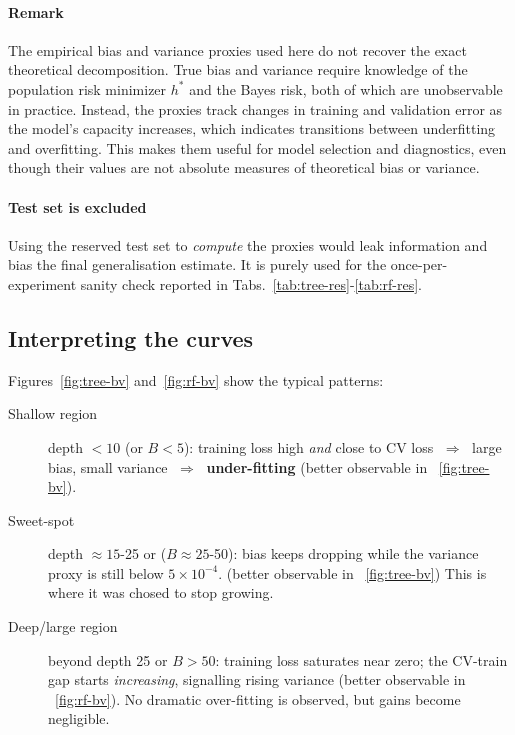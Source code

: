 \documentclass[12pt]{report}
\begin{document}
\paragraph{Remark}
The empirical bias and variance proxies used here do not recover the exact theoretical 
decomposition. True bias and variance require knowledge of the population risk minimizer 
$h^{*}$ and the Bayes risk, both of which are unobservable in practice. Instead, the 
proxies track changes in training and validation error as the model's capacity increases, 
which indicates transitions between underfitting and overfitting. 
This makes them useful for model selection and diagnostics, even though their values are 
not absolute measures of theoretical bias or variance.

\paragraph{Test set is excluded}
Using the reserved test set to \emph{compute} the proxies would leak information
and bias the final generalisation estimate. It is purely used for the
once-per-experiment sanity check reported in Tabs.~\ref{tab:tree-res}-\ref{tab:rf-res}.

\subsection{Interpreting the curves}

Figures~\ref{fig:tree-bv} and~\ref{fig:rf-bv} show the typical patterns:

\begin{description}
  \item[Shallow region]  
        depth $<\!10$ (or $B<\!5$): training loss high \emph{and} close to
        CV loss $\;\Rightarrow\;$ large bias, small variance
        $\;\Rightarrow\;$ \textbf{under-fitting} 
        (better observable in ~\ref{fig:tree-bv}).
  \item[Sweet-spot]  
        depth $\approx15$-25 or ($B\approx25$-50): bias keeps dropping while
        the variance proxy is still below $5\!\times\!10^{-4}$.
        (better observable in ~\ref{fig:tree-bv})
        This is where it was chosed to stop growing.
  \item[Deep/large region]  
        beyond depth 25 or $B>50$: training loss saturates near zero; the
        CV-train gap starts \emph{increasing}, signalling rising variance 
        (better observable in ~\ref{fig:rf-bv}).
        No dramatic over-fitting is observed, but gains become negligible.
\end{description}
\end{document}
